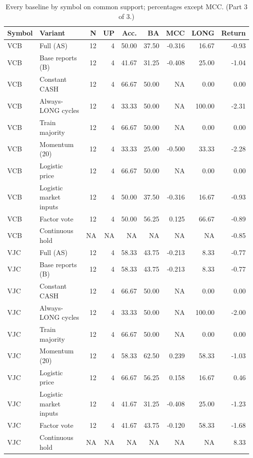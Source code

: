 \begin{table}[htbp]
\centering\small
\caption{Every baseline by symbol on common support; percentages except MCC. (Part 3 of 3.)}
\label{tab:r1_common_symbols_3}
\setlength{\tabcolsep}{3.5pt}
\begin{tabular}{llrrrrrrr}
\hline
Symbol & Variant & N & UP & Acc. & BA & MCC & LONG & Return \\
\hline
VCB & Full (AS) & 12 & 4 & 50.00 & 37.50 & -0.316 & 16.67 & -0.93 \\
VCB & Base reports (B) & 12 & 4 & 41.67 & 31.25 & -0.408 & 25.00 & -1.04 \\
VCB & Constant CASH & 12 & 4 & 66.67 & 50.00 & NA & 0.00 & 0.00 \\
VCB & Always-LONG cycles & 12 & 4 & 33.33 & 50.00 & NA & 100.00 & -2.31 \\
VCB & Train majority & 12 & 4 & 66.67 & 50.00 & NA & 0.00 & 0.00 \\
VCB & Momentum (20) & 12 & 4 & 33.33 & 25.00 & -0.500 & 33.33 & -2.28 \\
VCB & Logistic price & 12 & 4 & 66.67 & 50.00 & NA & 0.00 & 0.00 \\
VCB & Logistic market inputs & 12 & 4 & 50.00 & 37.50 & -0.316 & 16.67 & -0.93 \\
VCB & Factor vote & 12 & 4 & 50.00 & 56.25 & 0.125 & 66.67 & -0.89 \\
VCB & Continuous hold & NA & NA & NA & NA & NA & NA & -0.85 \\
VJC & Full (AS) & 12 & 4 & 58.33 & 43.75 & -0.213 & 8.33 & -0.77 \\
VJC & Base reports (B) & 12 & 4 & 58.33 & 43.75 & -0.213 & 8.33 & -0.77 \\
VJC & Constant CASH & 12 & 4 & 66.67 & 50.00 & NA & 0.00 & 0.00 \\
VJC & Always-LONG cycles & 12 & 4 & 33.33 & 50.00 & NA & 100.00 & -2.00 \\
VJC & Train majority & 12 & 4 & 66.67 & 50.00 & NA & 0.00 & 0.00 \\
VJC & Momentum (20) & 12 & 4 & 58.33 & 62.50 & 0.239 & 58.33 & -1.03 \\
VJC & Logistic price & 12 & 4 & 66.67 & 56.25 & 0.158 & 16.67 & 0.46 \\
VJC & Logistic market inputs & 12 & 4 & 41.67 & 31.25 & -0.408 & 25.00 & -1.23 \\
VJC & Factor vote & 12 & 4 & 41.67 & 43.75 & -0.120 & 58.33 & -1.68 \\
VJC & Continuous hold & NA & NA & NA & NA & NA & NA & 8.33 \\

\end{tabular}
\end{table}
